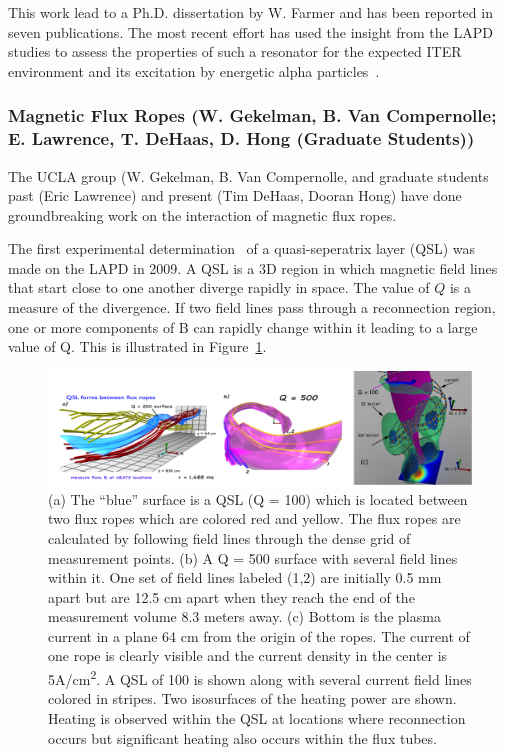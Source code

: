 \documentclass[11pt]{article}
\renewcommand{\cite}{\citep}
\begin{document}
This work lead to a Ph.D. dissertation by W. Farmer and has been
reported in seven publications. The most recent effort has used the
insight from the LAPD studies to assess the properties of such a
resonator for the expected ITER environment and its excitation by
energetic alpha particles~\cite{farmer:2014}.


\subsubsection{Magnetic Flux Ropes (W. Gekelman, B. Van Compernolle; E.
Lawrence, T. DeHaas, D. Hong (Graduate Students))}

The UCLA group (W. Gekelman, B. Van Compernolle, and graduate students
past (Eric Lawrence) and present (Tim DeHaas, Dooran Hong) have done
groundbreaking work on the interaction of magnetic flux ropes. 

The first experimental
determination~\cite{lawrence:2009} of a quasi-seperatrix layer
(QSL) was made on the LAPD in 2009. A QSL is a 3D region in which
magnetic field lines that start close to one another diverge rapidly in
space. The value of $Q$ is a measure of the divergence. If two field lines
pass through a reconnection region, one or more components of B can
rapidly change within it leading to a large value of Q. This is
illustrated in Figure~\ref{ropes}.

\begin{figure}[!htbp]
\centerline{\includegraphics[width=6.2truein]{ropes}}
\caption{(a) The ``blue'' surface is a QSL (Q = 100) which is located
between two flux ropes which are colored red and yellow. The flux ropes
are calculated by following field lines through the dense grid of
measurement points. (b) A Q = 500 surface with several field lines
within it. One set of field lines labeled (1,2) are initially 0.5 mm
apart but are 12.5 cm apart when they reach the end of the measurement
volume 8.3 meters away. (c) Bottom is the plasma current in a plane 64 cm from the origin
of the ropes. The current of one rope is clearly visible and the current
density in the center is 5A/cm\textsuperscript{2}. A QSL of 100 is shown
along with several current field lines colored in stripes. Two
isosurfaces of the heating power are shown. Heating is observed within
the QSL at locations where reconnection occurs but significant heating
also occurs within the flux tubes.}\label{ropes}
\end{figure}
\end{document}
